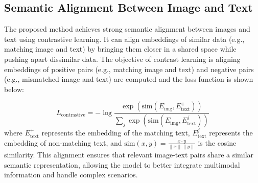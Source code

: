 \subsection{Semantic Alignment Between Image and Text}
The proposed method achieves strong semantic alignment between images and text using contrastive learning. It can align embeddings of similar data (e.g., matching image and text) by bringing them closer in a shared space while pushing apart dissimilar data.
% 
The objective of contrast learning is aligning embeddings of positive pairs (e.g., matching image and text) and negative pairs (e.g., mismatched image and text) are computed and the loss function is shown below:

    \begin{equation}
        L_{\text{contrastive}} = -\log \frac{\exp(\text{sim}(E_{\text{img}}, E_{\text{text}}^+))}{\sum_j \exp(\text{sim}(E_{\text{img}}, E_{\text{text}}^j))}
    \end{equation}
where $E_{\text{text}}^+$ represents the embedding of the matching text, $E_{\text{text}}^j$ represents the embedding of non-matching text, and $\text{sim}(x, y) = \frac{x \cdot y}{\|x\| \|y\|}$ is the cosine similarity.
This alignment ensures that relevant image-text pairs share a similar semantic representation, allowing the model to better integrate multimodal information and handle complex scenarios.



